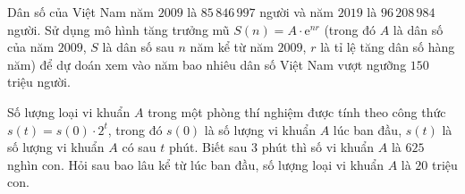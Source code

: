 \begin{bt}%

	Dân số của Việt Nam năm $2009$ là $85\,846\,997$ người và năm $2019$ là $96\,208\,984$ người. Sử dụng mô hình tăng trưởng mũ $S(n)=A \cdot \mathrm{e}^{n r}$ (trong đó $A$ là dân số của năm $2009$, $S$ là dân số sau $n$ năm kể từ năm $2009$, $r$ là tỉ lệ tăng dân số hàng năm) để dự doán xem vào năm bao nhiêu dân số Việt Nam vượt ngưỡng $150$ triệu người.
\end{bt}

\begin{bt}%
 
	Số lượng loại vi khuẩn $A$ trong một phòng thí nghiệm được tính theo công thức $s(t)=s(0)\cdot 2^t$, trong đó $s(0)$ là số lượng vi khuẩn $A$ lúc ban đầu, $s(t)$ là số lượng vi khuẩn $A$ có sau $t$ phút. Biết sau $3$ phút thì số vi khuẩn $A$ là $625$ nghìn con. Hỏi sau bao lâu kể từ lúc ban đầu, số lượng loại vi khuẩn $A$ là $20$ triệu con.
\end{bt}

